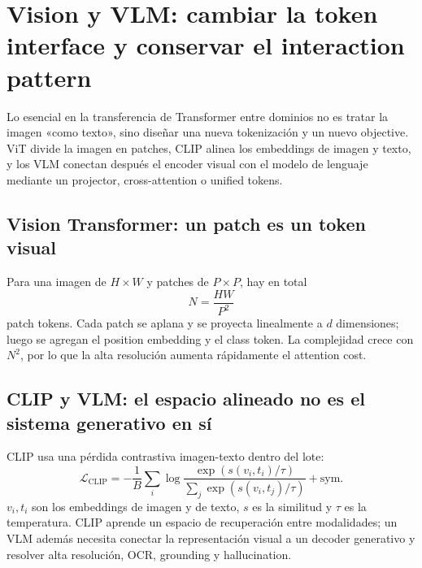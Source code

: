 \section{Vision y VLM: cambiar la token interface y conservar el interaction pattern}

Lo esencial en la transferencia de Transformer entre dominios no es tratar la imagen «como texto», sino diseñar una nueva tokenización y un nuevo objective. ViT divide la imagen en patches, CLIP alinea los embeddings de imagen y texto, y los VLM conectan después el encoder visual con el modelo de lenguaje mediante un projector, cross-attention o unified tokens.

\subsection{Vision Transformer: un patch es un token visual}

Para una imagen de $H\times W$ y patches de $P\times P$, hay en total
\[
N=\frac{HW}{P^2}
\]
patch tokens. Cada patch se aplana y se proyecta linealmente a $d$ dimensiones; luego se agregan el position embedding y el class token. La complejidad crece con $N^2$, por lo que la alta resolución aumenta rápidamente el attention cost.






\subsection{CLIP y VLM: el espacio alineado no es el sistema generativo en sí}

CLIP usa una pérdida contrastiva imagen-texto dentro del lote:
\[
\mathcal{L}_{\text{CLIP}}=-\frac{1}{B}\sum_i
\log\frac{\exp(s(v_i,t_i)/\tau)}{\sum_j\exp(s(v_i,t_j)/\tau)}+\text{sym.}
\]
$v_i,t_i$ son los embeddings de imagen y de texto, $s$ es la similitud y $\tau$ es la temperatura. CLIP aprende un espacio de recuperación entre modalidades; un VLM además necesita conectar la representación visual a un decoder generativo y resolver alta resolución, OCR, grounding y hallucination.


